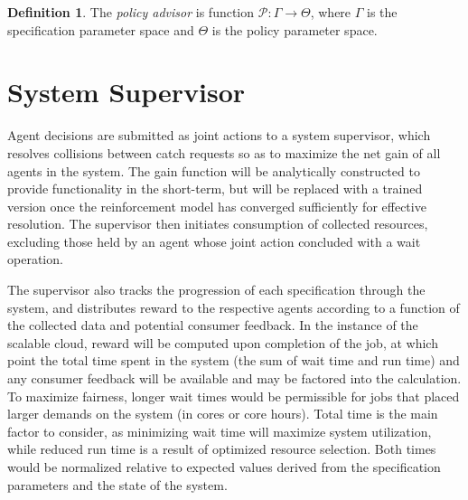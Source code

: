 \documentclass{article}
\theoremstyle{definition}
\newtheorem{definition}{Definition}[section]
\theoremstyle{remark}
\begin{document}
    \begin{definition}
        The \emph{policy advisor} is function $\mathcal{P}: \Gamma \rightarrow \Theta$, where $\Gamma$ is the specification
		parameter space and $\Theta$ is the policy parameter space.
    \end{definition}

	\section{System Supervisor}
	
	\indent
	
	Agent decisions are submitted as joint actions to a system supervisor, which resolves collisions between catch requests so as to maximize the net gain of all agents in the system. The gain function will be analytically constructed to provide functionality in the short-term, but will be replaced with a trained version once the reinforcement model has converged sufficiently for effective resolution. The supervisor then initiates consumption of collected resources, excluding those held by an agent whose joint action concluded with a wait operation.
	
	The supervisor also tracks the progression of each specification through the system, and distributes reward to the respective agents according to a function of the collected data and potential consumer feedback. In the instance of the scalable cloud, reward will be computed upon completion of the job, at which point the total time spent in the system (the sum of wait time and run time) and any consumer feedback will be available and may be factored into the calculation. To maximize fairness, longer wait times would be permissible for jobs that placed larger demands on the system (in cores or core hours). Total time is the main factor to consider, as minimizing wait time will maximize system utilization, while reduced run time is a result of optimized resource selection. Both times would be normalized relative to expected values derived from the specification parameters and the state of the system.
	
	\newpage    
\end{document}
